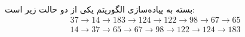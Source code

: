 \\\noindent
بسته به پیاده‌سازی الگوریتم یکی از دو حالت زیر است:
\begin{gather*}
    37 \rightarrow 14 \rightarrow 183 \rightarrow 124 \rightarrow 122 \rightarrow 98 \rightarrow 67 \rightarrow 65\\
    14 \rightarrow 37 \rightarrow 65 \rightarrow 67 \rightarrow 98 \rightarrow 122 \rightarrow 124 \rightarrow 183
\end{gather*}